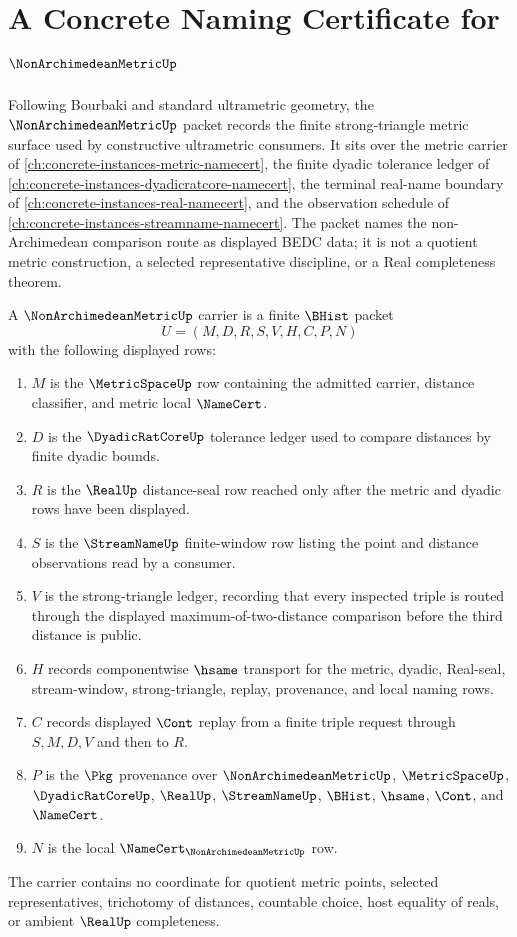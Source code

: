 \chapter{A Concrete Naming Certificate for $\NonArchimedeanMetricUp$}
\label{ch:concrete-instances-nonarchimedean-metric-namecert}

Following Bourbaki and standard ultrametric geometry, the $\NonArchimedeanMetricUp$ packet records the finite strong-triangle metric surface used by constructive ultrametric consumers. It sits over the metric carrier of \autoref{ch:concrete-instances-metric-namecert}, the finite dyadic tolerance ledger of \autoref{ch:concrete-instances-dyadicratcore-namecert}, the terminal real-name boundary of \autoref{ch:concrete-instances-real-namecert}, and the observation schedule of \autoref{ch:concrete-instances-streamname-namecert}. The packet names the non-Archimedean comparison route as displayed BEDC data; it is not a quotient metric construction, a selected representative discipline, or a Real completeness theorem.

\begin{definition}
\label{def:nonarchimedean-metric-carrier}
A $\NonArchimedeanMetricUp$ carrier is a finite $\BHist$ packet
$$
U=(M,D,R,S,V,H,C,P,N)
$$
with the following displayed rows:
\begin{enumerate}
\item $M$ is the $\MetricSpaceUp$ row containing the admitted carrier, distance classifier, and metric local $\NameCert$.
\item $D$ is the $\DyadicRatCoreUp$ tolerance ledger used to compare distances by finite dyadic bounds.
\item $R$ is the $\RealUp$ distance-seal row reached only after the metric and dyadic rows have been displayed.
\item $S$ is the $\StreamNameUp$ finite-window row listing the point and distance observations read by a consumer.
\item $V$ is the strong-triangle ledger, recording that every inspected triple is routed through the displayed maximum-of-two-distance comparison before the third distance is public.
\item $H$ records componentwise $\hsame$ transport for the metric, dyadic, Real-seal, stream-window, strong-triangle, replay, provenance, and local naming rows.
\item $C$ records displayed $\Cont$ replay from a finite triple request through $S,M,D,V$ and then to $R$.
\item $P$ is the $\Pkg$ provenance over $\NonArchimedeanMetricUp$, $\MetricSpaceUp$, $\DyadicRatCoreUp$, $\RealUp$, $\StreamNameUp$, $\BHist$, $\hsame$, $\Cont$, and $\NameCert$.
\item $N$ is the local $\NameCert_{\NonArchimedeanMetricUp}$ row.
\end{enumerate}
The carrier contains no coordinate for quotient metric points, selected representatives, trichotomy of distances, countable choice, host equality of reals, or ambient $\RealUp$ completeness.
\end{definition}

